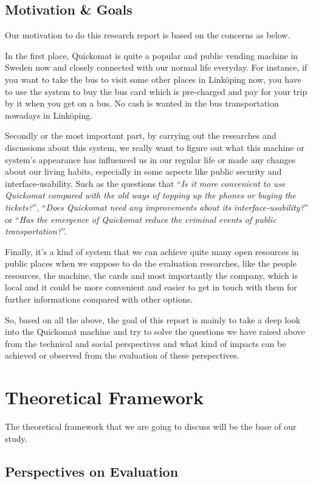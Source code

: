 \documentclass[twocolumn]{article}
\begin{document}
\subsection{Motivation \& Goals}
Our motivation to do this research report is based on the concerns as below.

In the first place, Quickomat is quite a popular and public vending machine in Sweden now and closely connected with our normal life everyday. For instance, if you want to take the bus to visit some other places in Linköping now, you have to use the system to buy the bus card which is pre-charged and pay for your trip by it when you get
on a bus. No cash is wanted in the bus transportation nowadays in Linköping.

Secondly or the most important part, by carrying out the researches and discussions about this system, we really want to figure out what this machine or system’s appearance has influenced us in our regular life or made any changes about our living habits, especially in some aspects like public security and interface-usability. Such as the
questions that “\emph{Is it more convenient to use Quickomat compared with the old ways of topping up the phones or buying the tickets?}”, “\emph{Does Quickomat need any improvements  about its interface-usability?}” or “\emph{Has the emergence of Quickomat reduce the criminal events of public transportation?}”.

Finally, it’s a kind of system that we can achieve quite many open resources in public places when we suppose to do the evaluation researches, like the people resources, the machine, the cards and most importantly the company, which is local and it could be more convenient and easier to get in touch with them for further informations compared with other options.

So, based on all the above, the goal of this report is mainly to take a deep look into the Quickomat machine and try to solve the questions we have raised above from the technical and social perspectives and what kind of impacts can be achieved or observed from the evaluation of these perspectives.

\section{Theoretical Framework}
The theoretical framework that we are going to discuss will be the base of our study.

\subsection{Perspectives on Evaluation}
\end{document}
